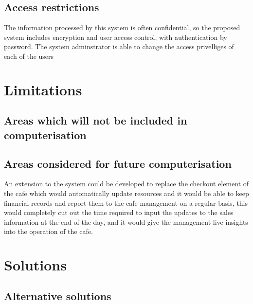 \subsection{Access restrictions}
	The information processed by this system is often confidential, so the proposed system includes encryption and user access control, with
	authentication by password. The system adminstrator is able to change the access privelliges of each of the users

\section{Limitations}

\subsection{Areas which will not be included in computerisation}

\subsection{Areas considered for future computerisation}
	An extension to the system could be developed to replace the checkout element of the cafe which would automatically update resources and
	it would be able to keep financial records and report them to the cafe management on a regular basis, this would completely cut out the time
	required to input the updates to the sales information at the end of the day, and it would give the management live insights into
	the operation of the cafe.

\section{Solutions}

\subsection{Alternative solutions}

